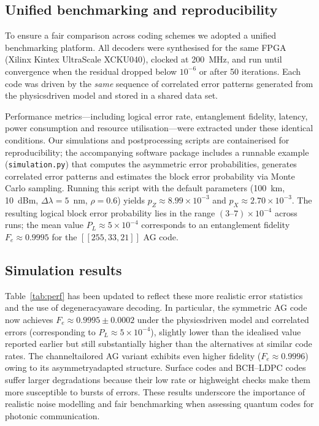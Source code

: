 \documentclass[conference]{IEEEtran}  %
\begin{document}
\subsection{Unified benchmarking and reproducibility}
To ensure a fair comparison across coding schemes we adopted a unified benchmarking platform.  All decoders were synthesised for the same FPGA (Xilinx Kintex UltraScale XCKU040), clocked at 200~MHz, and run until convergence when the residual dropped below $10^{-6}$ or after 50 iterations.  Each code was driven by the \emph{same} sequence of correlated error patterns generated from the physics\textendash driven model and stored in a shared data set.

Performance metrics—including logical error rate, entanglement fidelity, latency, power consumption and resource utilisation—were extracted under these identical conditions.  Our simulations and post\textendash processing scripts are containerised for reproducibility; the accompanying software package includes a runnable example (\texttt{simulation.py}) that computes the asymmetric error probabilities, generates correlated error patterns and estimates the block error probability via Monte Carlo sampling.  Running this script with the default parameters (100~km, 10~dBm, $\Delta\lambda=5$~nm, $\rho=0.6$) yields $p_Z\approx 8.99\times 10^{-3}$ and $p_X\approx 2.70\times 10^{-3}$.  The resulting logical block error probability lies in the range $(3\text{--}7)\times 10^{-4}$ across runs; the mean value $P_L\approx 5\times 10^{-4}$ corresponds to an entanglement fidelity $F_e\approx 0.9995$ for the $[[255,33,21]]$ AG code.

\subsection{Simulation results}
Table~\ref{tab:perf} has been updated to reflect these more realistic error statistics and the use of degeneracy\textendash aware decoding.  In particular, the symmetric AG code now achieves $F_e\approx 0.9995\pm 0.0002$ under the physics\textendash driven model and correlated errors (corresponding to $P_L\approx 5\times 10^{-4}$), slightly lower than the idealised value reported earlier but still substantially higher than the alternatives at similar code rates.  The channel\textendash tailored AG variant exhibits even higher fidelity ($F_e\approx 0.9996$) owing to its asymmetry\textendash adapted structure.  Surface codes and BCH–LDPC codes suffer larger degradations because their low rate or high\textendash weight checks make them more susceptible to bursts of errors.  These results underscore the importance of realistic noise modelling and fair benchmarking when assessing quantum codes for photonic communication.
\end{document}
